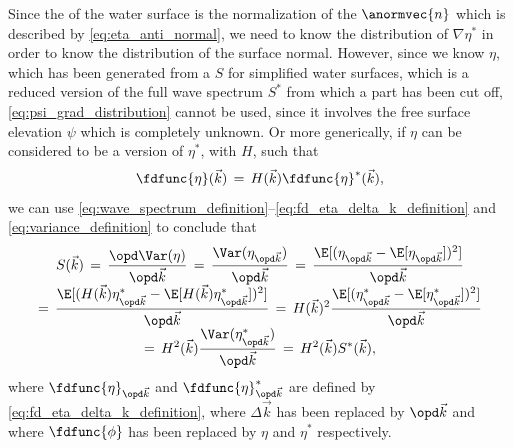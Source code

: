 Since the  of the water surface is the normalization of the  $\anormvec{n}$ which is described by \eqref{eq:eta_anti_normal}, we need to know the distribution of $\nabla\eta^*$ in order to know the distribution of the surface normal. However, since we know $\eta$, which has been generated from a  $S$ for simplified water surfaces, which is a reduced version of the full wave spectrum $S^*$ from which a part has been cut off, \eqref{eq:psi_grad_distribution} cannot be used, since it involves the free surface elevation $\psi$ which is completely unknown. Or more generically, if $\eta$ can be considered to be a  version of $\eta^*$, with  $H$, such that
%
\begin{equation}
\fdfunc{\eta}(\vec{k}) \,=\, H(\vec{k})\fdfunc{\eta}^*(\vec{k}),
\end{equation}
%
we can use  \ref{eq:wave_spectrum_definition}--\ref{eq:fd_eta_delta_k_definition} and \eqref{eq:variance_definition} to conclude that
%
\begin{equation} \label{spectrum_reduced_definition}
\renewcommand*{\arraystretch}{2}
\begin{array}{c}
\displaystyle S(\vec{k}) \,=\, \frac{\opd \Var(\eta)}{\opd\vec{k}} \,=\, \frac{\Var(\eta_{\opd\vec{k}})}{\opd\vec{k}} \,=\, \frac{\E[(\eta_{\opd\vec{k}}-\E[\eta_{\opd\vec{k}}])^2]}{\opd\vec{k}} \\
\displaystyle =\, \frac{\E[(H(\vec{k})\eta^*_{\opd\vec{k}}-\E[H(\vec{k})\eta^*_{\opd\vec{k}}])^2]}{\opd\vec{k}} \,=\, H(\vec{k})^2\frac{\E[(\eta^*_{\opd\vec{k}}-\E[\eta^*_{\opd\vec{k}}])^2]}{\opd\vec{k}} \\
\displaystyle =\, H^2(\vec{k})\frac{\Var(\eta^*_{\opd\vec{k}})}{\opd\vec{k}} \,=\, H^2(\vec{k})S^*(\vec{k}),
\end{array}
\end{equation}
%
where $\fdfunc{\eta}_{\opd\vec{k}}$ and $\fdfunc{\eta}^*_{\opd\vec{k}}$ are defined by \eqref{eq:fd_eta_delta_k_definition}, where $\Delta\vec{k}$ has been replaced by $\opd\vec{k}$ and where $\fdfunc{\phi}$ has been replaced by $\eta$ and $\eta^*$ respectively.

